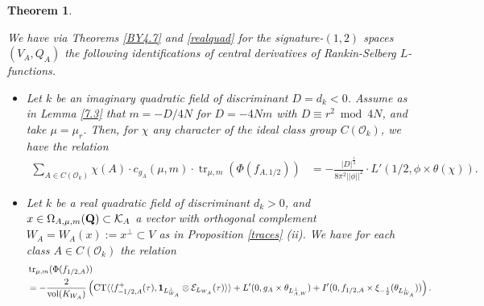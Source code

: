 \documentclass{amsart}
\newtheorem{theorem}{Theorem}[section]
\theoremstyle{definition}
\theoremstyle{definition}
\theoremstyle{definition}
\begin{document}
\begin{theorem}\label{metatrace} 

We have via Theorems \ref{BY4.7} and \ref{realquad} for the signature-$(1,2)$ spaces $(V_A,Q_A)$ the following identifications of central derivatives of Rankin-Selberg $L$-functions. 

\begin{itemize}

\item[(i)] Let $k$ be an imaginary quadratic field of discriminant $D = d_k <0$. 
Assume as in Lemma \ref{7.3} that $m = -D/4N$ for $D = -4Nm$ with $D \equiv r^2 \bmod 4N$, and take $\mu = \mu_r$.
Then, for $\chi$ any character of the ideal class group $C(\mathcal{O}_k)$, we have the relation 
\begin{align*} \sum\limits_{A \in C(\mathcal{O}_k)} \chi(A) \cdot c_{g_A}(\mu, m) \cdot \operatorname{tr}_{\mu, m} \left( \Phi(f_{A, 1/2}) \right) 
&= - \frac{ \vert D \vert^{\frac{1}{2}}}{ 8 \pi^2 \vert \vert \phi \vert \vert^2  } \cdot L'(1/2, \phi \times \theta(\chi)). \end{align*}
 
\item[(ii)] Let $k$ be a real quadratic field of discriminant $d_k >0$, and $x \in \Omega_{A, \mu, m}({\bf{Q}}) \subset \mathcal{K}_A$ a vector 
with orthogonal complement $W_A = W_A(x) := x^{\perp} \subset V$ as in Proposition \ref{traces} (ii). We have for each class $A \in C(\mathcal{O}_k)$ the relation 
\begin{equation*}\begin{aligned} &\operatorname{tr}_{\mu, m}(\Phi(f_{1/2, A})) \\ &= - \frac{2}{\operatorname{vol}(K_{W_A})} 
\left(  \operatorname{CT} \langle \langle f_{-1/2, A}^+(\tau), {\bf{1}}_{L_{W_A}^{\perp}} \otimes \mathcal{E}_{L_{W_A}}(\tau) \rangle \rangle
+ L'(0, g_A \times \theta_{L_{A, W}^{\perp}}) + I'(0, f_{1/2, A} \times \xi_{-\frac{1}{2}}(\theta_{L_{W_A}^{\perp}}) )\right). \end{aligned}\end{equation*}

\end{itemize}

\end{theorem}
\end{document}
